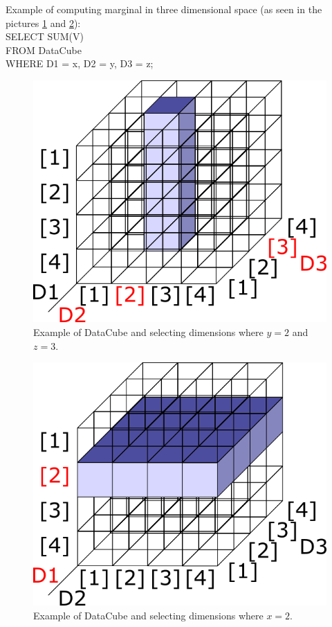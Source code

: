 Example of computing marginal in three dimensional space (as seen in the pictures \ref{margin1} and \ref{margin2}):\\
SELECT SUM(V) \\
FROM DataCube \\
WHERE D1 = x, D2 = y, D3 = z;\\
\begin{figure}
\centering
\includegraphics[scale=0.5]{marg1d.png}
\caption{Example of DataCube and selecting dimensions where $y=2$ and $z=3$.}
\label{margin1}
\end{figure}
\begin{figure}
\centering
\includegraphics[scale=0.5]{marg2d.png}
\caption{Example of DataCube and selecting dimensions where $x=2$.}
\label{margin2}
\end{figure}

